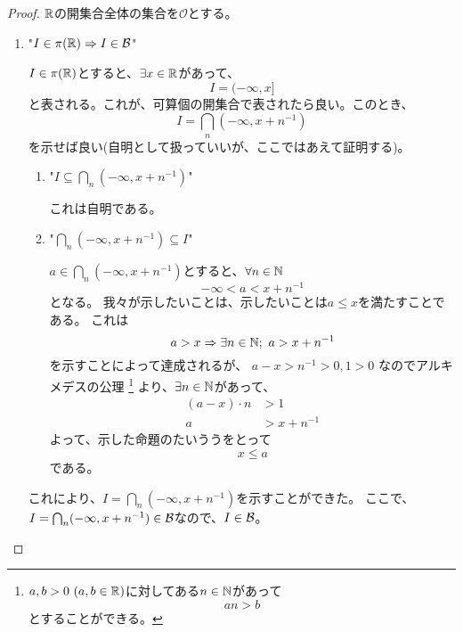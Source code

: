         \begin{proof}
            ${\mathbb{R}}$の開集合全体の集合を$\mathcal{O}$とする。
            \begin{enumerate}[font = \bfseries, label = step \arabic*.]
                \item "$I\in\pi({\mathbb{R}})\Rightarrow I\in {\mathcal{B}}$"\par
                    $I\in\pi({\mathbb{R}})$とすると、$\exists x\in{\mathbb{R}}$があって、
                    \[
                        I = (-\infty, x]
                    \]
                    と表される。これが、可算個の開集合で表されたら良い。このとき、
                    \[
                        I = \bigcap_{n} (-\infty, x + n^{-1})
                    \]
                    を示せば良い(自明として扱っていいが、ここではあえて証明する)。
                    \begin{enumerate}
                        \item "$I\subseteq \bigcap_{n} (-\infty, x + n^{-1})$"\par
                            これは自明である。
                        \item "$\bigcap_{n} (-\infty, x + n^{-1})\subseteq I$"\par
                            $a\in\bigcap_{n} (-\infty, x + n^{-1})$とすると、$\forall n\in{\mathbb{N}}$
                            \[
                                -\infty<a<x + n^{-1}
                            \]
                            となる。
                            我々が示したいことは、示したいことは$a\leq x$を満たすことである。
                            これは
                            \[
                                a > x \Rightarrow \exists n \in {\mathbb{N}};\ a > x + n^{-1}
                            \]
                            を示すことによって達成されるが、
                            $a-x > n^{-1} > 0, 1 > 0$
                            なのでアルキメデスの公理
                            \footnote{
                                $a, b > 0\ (a, b\in {\mathbb{R}})$に対してある$n\in{\mathbb{N}}$があって
                                \[
                                    an > b
                                \]
                                とすることができる。
                            }
                            より、$\exists n \in {\mathbb{N}}$があって、
                            \begin{align*}
                                (a-x)\cdot n &> 1\\
                                a &> x + n^{-1}
                            \end{align*}
                            よって、示した命題のたいううをとって
                            \[
                                x \leq a
                            \]
                            である。
                    \end{enumerate}
                    これにより、$I = \bigcap_{n} (-\infty, x + n^{-1})$を示すことができた。
                    ここで、$I = \bigcap_{n} (-\infty, x + n^{-1}) \in {\mathcal{B}}$なので、$I\in{\mathcal{B}}$。
    

\end{enumerate}
\end{proof}
